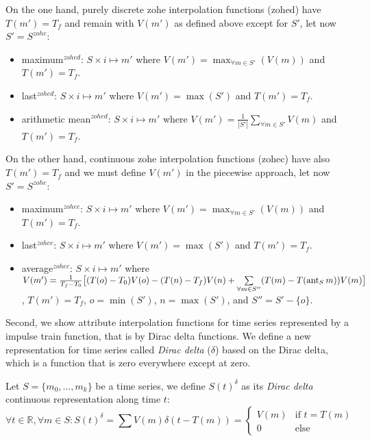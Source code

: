 On the one hand, purely discrete zohe interpolation functions (zohed)
have $T(m')=T_f$ and remain with $V(m')$ as defined above except for
$S'$, let now $S'=S^{zohe}$:
\begin{itemize}
\item maximum$^{zohed}$: $S \times i \mapsto m'$ where $V(m') =
  \max_{\forall m \in S'}(V(m))$ and $T(m')=T_f$.
\item last$^{zohed}$: $S \times i \mapsto m'$ where $V(m') = \max(S')$ and
  $T(m')=T_f$.
\item arithmetic mean$^{zohed}$: $S \times i \mapsto m'$ where $V(m')
  = \frac{1}{|S'|} \sum\limits_{\forall m\in S'} V(m)$ and
  $T(m')=T_f$. 
\end{itemize}
On the other hand, continuous zohe interpolation functions (zohec)
have also $T(m')=T_f$ and we must define $V(m')$ in the piecewise
approach, let now $S'=S^{zohe}$:
\begin{itemize}
\item maximum$^{zohec}$: $S \times i \mapsto m'$ where $V(m') =
  \max_{\forall m \in S'}(V(m))$ and $T(m')=T_f$.
\item last$^{zohec}$: $S \times i \mapsto m'$ where $V(m') = \max(S')$
  and $T(m')=T_f$.
\item average$^{zohec}$: $S \times i \mapsto m'$ where $V(m') =
  \frac{1}{T_f-T_0} \big[ (T(o)-T_0)V(o) -( T(n)-T_f)V(n) +
  \sum\limits_{\forall m \in S''}( T(m)- T(\operatorname*{ant}_S m) )V(m) \big]$,
  $T(m')=T_f$, $o=\min(S')$, $n=\max(S')$, and $S''= S' - \{o\}$.
\end{itemize}



Second, we show attribute interpolation functions for time series
represented by a impulse train function, that is by Dirac delta
functions.  We define a new representation for time series called
\emph{Dirac delta} ($\delta$) based on the Dirac delta, which is a
function that is zero everywhere except at zero.

Let $S=\{m_0,\ldots,m_k\}$ be a time series, we define $S(t)^{\delta}$
as its \emph{Dirac delta} continuous representation along time $t$:
\[
\forall t \in \mathbb{R}  ,\forall m \in S:
S(t)^{\delta} =  \sum V(m)\delta(t-T(m)) =
\begin{cases}
  V(m) & \text{if }  t=T(m) \\
  0 & \text{else} 
\end{cases}
\]

